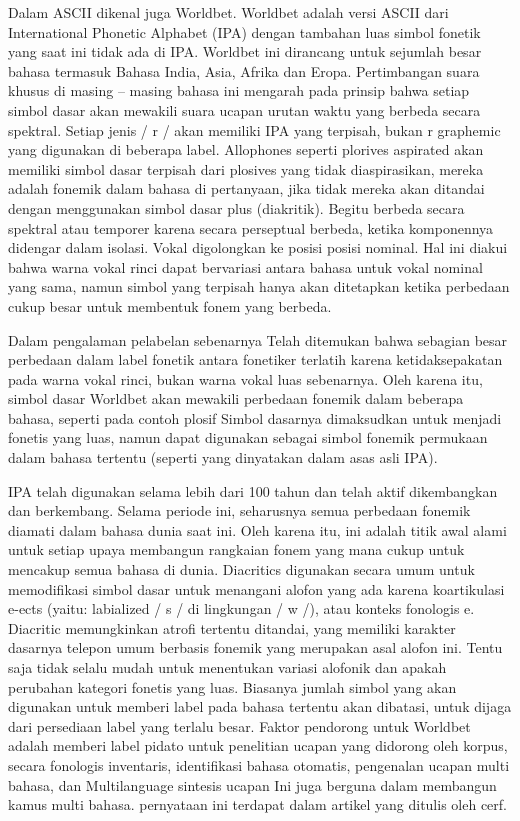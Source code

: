  Dalam ASCII dikenal juga Worldbet. Worldbet adalah versi ASCII dari  International Phonetic Alphabet (IPA) dengan tambahan luas simbol fonetik yang saat ini tidak ada di IPA. Worldbet ini dirancang untuk sejumlah besar bahasa termasuk Bahasa India, Asia, Afrika dan Eropa. Pertimbangan suara khusus di masing – masing bahasa ini mengarah pada prinsip bahwa setiap simbol dasar akan mewakili suara ucapan urutan waktu yang berbeda secara spektral. Setiap jenis / r / akan memiliki IPA yang terpisah, bukan r graphemic yang digunakan di beberapa label. Allophones seperti plorives aspirated akan memiliki simbol dasar terpisah dari plosives yang tidak diaspirasikan, mereka adalah fonemik dalam bahasa di pertanyaan, jika tidak mereka akan ditandai dengan menggunakan simbol dasar plus (diakritik). Begitu berbeda secara spektral atau temporer karena secara perseptual berbeda, ketika komponennya didengar dalam isolasi. Vokal digolongkan ke posisi posisi nominal. Hal ini diakui bahwa warna vokal rinci dapat bervariasi antara bahasa untuk vokal nominal yang sama, namun simbol yang terpisah hanya akan ditetapkan ketika perbedaan cukup besar untuk membentuk fonem yang berbeda.

 	Dalam pengalaman pelabelan sebenarnya Telah ditemukan bahwa sebagian besar perbedaan dalam label fonetik antara fonetiker terlatih karena ketidaksepakatan pada warna vokal rinci, bukan warna vokal luas sebenarnya. Oleh karena itu, simbol dasar Worldbet akan mewakili perbedaan fonemik dalam beberapa bahasa, seperti pada contoh plosif Simbol dasarnya dimaksudkan untuk menjadi fonetis yang luas, namun dapat digunakan sebagai simbol fonemik permukaan dalam bahasa tertentu (seperti yang dinyatakan dalam asas asli IPA).

 	IPA telah digunakan selama lebih dari 100 tahun dan telah aktif dikembangkan dan berkembang. Selama periode ini, seharusnya semua perbedaan fonemik diamati dalam bahasa dunia saat ini. Oleh karena itu, ini adalah titik awal alami untuk setiap upaya membangun rangkaian fonem yang mana cukup untuk mencakup semua bahasa di dunia.
 	Diacritics digunakan secara umum untuk memodifikasi simbol dasar untuk menangani alofon yang ada karena koartikulasi e-ects (yaitu: labialized / s / di lingkungan / w /), atau konteks fonologis e. Diacritic memungkinkan atrofi tertentu ditandai, yang memiliki karakter dasarnya telepon umum berbasis fonemik yang merupakan asal alofon ini. Tentu saja tidak selalu mudah untuk menentukan variasi alofonik dan apakah perubahan kategori fonetis yang luas. Biasanya jumlah simbol yang akan digunakan untuk memberi label pada bahasa tertentu akan dibatasi, untuk dijaga dari persediaan label yang terlalu besar. Faktor pendorong untuk Worldbet adalah memberi label pidato untuk penelitian ucapan yang didorong oleh korpus, secara fonologis inventaris, identifikasi bahasa otomatis, pengenalan ucapan multi bahasa, dan Multilanguage sintesis ucapan Ini juga berguna dalam membangun kamus multi bahasa. pernyataan ini terdapat dalam artikel yang ditulis oleh cerf. \cite{cerf1969ascii}

